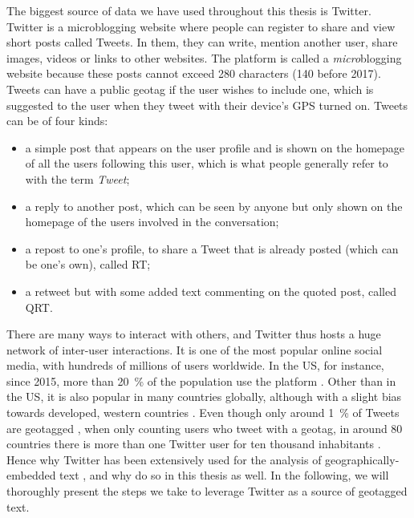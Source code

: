 \documentclass[../thesis.tex]{subfiles}
\begin{document}
The biggest source of data we have used throughout this thesis is Twitter. Twitter is a
microblogging website where people can register to share and view short posts called
Tweets. In them, they can write, mention another user, share images, videos or links to
other websites. The platform is called a \emph{micro}blogging website because these
posts cannot exceed 280 characters (140 before 2017). Tweets
can have a public geotag if the user wishes to include one, which is suggested to the
user when they tweet with their device's GPS turned on. Tweets can be of four kinds:
\begin{itemize}
  \item a simple post that appears on the user profile and is shown on the homepage of
  all the users following this user, which is what people generally refer to with the
  term \emph{Tweet};
  \item a reply to another post, which can be seen by anyone but only shown on the
  homepage of the users involved in the conversation;
  \item a repost to one's profile, to share a Tweet that is already posted (which can be
  one's own), called \ac{RT};
  \item a retweet but with some added text commenting on the quoted post, called
  \ac{QRT}.
\end{itemize}
There are many ways to interact with others, and Twitter thus hosts a huge network of
inter-user interactions. It is one of the most popular online social media, with
hundreds of millions of users worldwide. In the US, for instance, since 2015, more than
\SI{20}{\percent} of the population use the platform \cite{AuxierSocialMedia2021}. Other
than in the US, it is also popular in many countries globally, although with a slight
bias towards developed, western countries \cite{HawelkaGeolocatedTwitter2014}. Even
though only around \SI{1}{\percent} of Tweets are geotagged
\cite{MorstatterSampleGood2021}, when only counting users who tweet with a geotag, in
around 80 countries there is more than one Twitter user for ten thousand inhabitants
\cite{MocanuTwitterBabel2013}. Hence why Twitter has been extensively used for the
analysis of geographically-embedded text
\cite{ArthurHumanGeography2019,BokanyiRaceReligion2016,BokanyiScalingWords2019,GoncalvesCrowdsourcingDialect2014,GoncalvesLearningSpanish2016,GoncalvesMappingAmericanization2018,
GrieveMappingLexical2019,HuangUnderstandingRegional2016,KoyluUncoveringGeoSocial2018,MocanuTwitterBabel2013,NguyenAudienceUse2015,LamannaImmigrantCommunity2018},
and why do so in this thesis as well. In the following, we will thoroughly present the
steps we take to leverage Twitter as a source of geotagged text.
\end{document}
